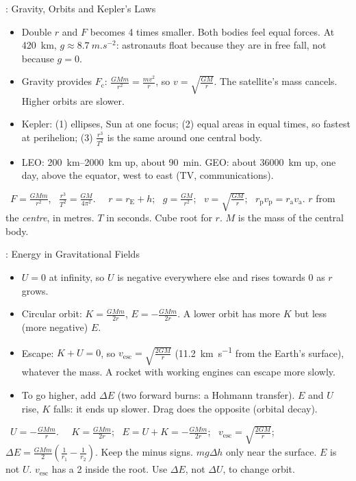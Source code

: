 \begin{summarybox}[fontupper=\small, unbreakable]{: Gravity, Orbits and Kepler's Laws}
\begin{itemize}[itemsep=0pt, topsep=0pt]
  \item Double $r$ and $F$ becomes 4 times smaller. Both bodies feel equal forces. At
        \qty{420}{km}, $g \approx \qty{8.7}{m.s^{-2}}$: astronauts float because they are in
        free fall, not because $g = 0$.
  \item Gravity provides $F_\mathrm{c}$: $\frac{GMm}{r^2} = \frac{mv^2}{r}$, so
        $v = \sqrt{\frac{GM}{r}}$. The satellite's mass cancels. Higher orbits are slower.
  \item Kepler: (1) ellipses, Sun at one focus; (2) equal areas in equal times, so fastest at
        perihelion; (3) $\frac{r^3}{T^2}$ is the same around one central body.
  \item LEO: \qtyrange{200}{2000}{km} up, about \qty{90}{min}. GEO: about \qty{36000}{km}
        up, one day, above the equator, west to east (TV, communications).
\end{itemize}
 \sumSheet\ $F = \frac{GMm}{r^2}$, \ $\frac{r^3}{T^2} = \frac{GM}{4\pi^2}$.
\ \sumLearn\ $r = r_\mathrm{E} + h$; \ $g = \frac{GM}{r^2}$; \ $v = \sqrt{\frac{GM}{r}}$; \
$r_\mathrm{p}v_\mathrm{p} = r_\mathrm{a}v_\mathrm{a}$.
 $r$ from the \emph{centre}, in metres. $T$ in seconds. Cube root for $r$.
$M$ is the mass of the central body.
\end{summarybox}

\begin{summarybox}[fontupper=\small, unbreakable]{: Energy in Gravitational Fields}
\begin{itemize}[itemsep=0pt, topsep=0pt]
  \item $U = 0$ at infinity, so $U$ is negative everywhere else and rises towards 0 as $r$
        grows.
  \item Circular orbit: $K = \frac{GMm}{2r}$, $E = -\frac{GMm}{2r}$. A lower orbit has more
        $K$ but less (more negative) $E$.
  \item Escape: $K + U = 0$, so $v_\mathrm{esc} = \sqrt{\frac{2GM}{r}}$ (\qty{11.2}{km.s^{-1}}
        from the Earth's surface), whatever the mass. A rocket with working engines can
        escape more slowly.
  \item To go higher, add $\Delta E$ (two forward burns: a Hohmann transfer). $E$ and $U$
        rise, $K$ falls: it ends up slower. Drag does the opposite (orbital decay).
\end{itemize}
 \sumSheet\ $U = -\frac{GMm}{r}$. \ \sumLearn\ $K = \frac{GMm}{2r}$; \
$E = U + K = -\frac{GMm}{2r}$; \ $v_\mathrm{esc} = \sqrt{\frac{2GM}{r}}$; \
$\Delta E = \frac{GMm}{2}\left(\frac{1}{r_1} - \frac{1}{r_2}\right)$.
\sumhead{Traps} Keep the minus signs. $mg\Delta h$ only near the surface. $E$ is not $U$.
$v_\mathrm{esc}$ has a 2 inside the root. Use $\Delta E$, not $\Delta U$, to change orbit.
\end{summarybox}
